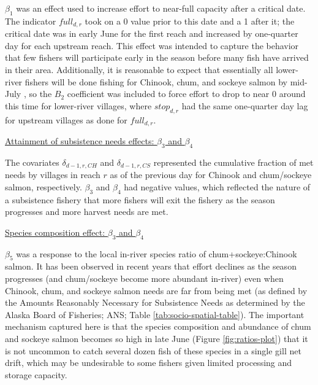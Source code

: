 \documentclass[12pt,]{book}
\theoremstyle{definition}
\theoremstyle{definition}
\theoremstyle{definition}
\theoremstyle{remark}
\begin{document}
\noindent
\(\beta_1\) was an effect used to increase effort to near-full capacity
after a critical date. The indicator \(full_{d,r}\) took on a 0 value
prior to this date and a 1 after it; the critical date was in early June
for the first reach and increased by one-quarter day for each upstream
reach. This effect was intended to capture the behavior that few fishers
will participate early in the season before many fish have arrived in
their area. Additionally, it is reasonable to expect that essentially
all lower-river fishers will be done fishing for Chinook, chum, and
sockeye salmon by mid-July \citep{hamazaki-2008}, so the \(B_2\)
coefficient was included to force effort to drop to near 0 around this
time for lower-river villages, where \(stop_{d,r}\) had the same
one-quarter day lag for upstream villages as done for \(full_{d,r}\).

\noindent
\underline{Attainment of subsistence needs effects: $\beta_3$ and $\beta_4$}

\noindent
The covariates \(\delta_{d-1,r,CH}\) and \(\delta_{d-1,r,CS}\)
represented the cumulative fraction of met needs by villages in reach
\(r\) as of the previous day for Chinook and chum/sockeye salmon,
respectively. \(\beta_3\) and \(\beta_4\) had negative values, which
reflected the nature of a subsistence fishery that more fishers will
exit the fishery as the season progresses and more harvest needs are
met.

\noindent
\underline{Species composition effect: $\beta_3$ and $\beta_4$}

\noindent
\(\beta_5\) was a response to the local in-river species ratio of
chum+sockeye:Chinook salmon. It has been observed in recent years that
effort declines as the season progresses (and chum/sockeye become more
abundant in-river) even when Chinook, chum, and sockeye salmon needs are
far from being met (as defined by the Amounts Reasonably Necessary for
Subsistence Needs as determined by the Alaska Board of Fisheries; ANS;
Table \ref{tab:socio-spatial-table}). The important mechanism captured
here is that the species composition and abundance of chum and sockeye
salmon becomes so high in late June (Figure \ref{fig:ratios-plot}) that
it is not uncommon to catch several dozen fish of these species in a
single gill net drift, which may be undesirable to some fishers given
limited processing and storage capacity.
\end{document}
